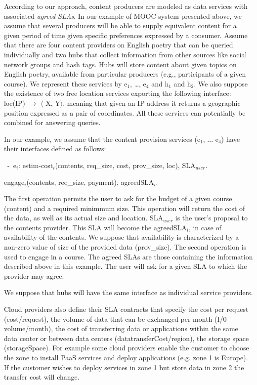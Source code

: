 According to our approach, content producers are modeled as data services with associated \textit{agreed SLAs}. 
In our example of MOOC system presented above, we assume that several producers will be able to supply equivalent content for a given period of time  given specific  preferences expressed by a consumer. 
Assume that there are four content providers on English poetry that can be queried individually and two hubs that collect information from other sources like social network groups and hash tags.
Hubs will store content about given topics on  English poetry, available from particular producers (e.g., participants of a given course).
We represent these services by {\sf e$_1$, \dots, e$_4$} and {\sf h$_1$} and {\sf h$_2$}.
We also suppose the existence of two free location services exporting the following interface: {\sf loc(IP) $\rightarrow$ $\langle$ X, Y$\rangle$}, meaning that given an IP address it returns a geographic position expressed as a pair of coordinates. 
All these services can potentially be combined for answering queries.

In our example, we assume that the content provision services ({\sf e$_1$, ... e$_4$}) have their interfaces defined as follows:
\begin{trivlist}\sf\footnotesize
\item[~-~e$_i$:]estim-cost$_i$(contents, req\_size, cost, prov\_size, loc), SLA$_\mathit{user}$.

                engage$_i$(contents, req\_size, payment), agreedSLA$_i$.
\end{trivlist}

The first operation permits the user to ask for the budget of a given course (content) and a required minimmum size.
This operation will return the cost of the data, as well as its actual size and location.
{\sf SLA}$_\mathit{user}$ is the user's proposal to the contents provider. 
This SLA will become the {\sf agreedSLA}$_i$, in case of availability of the contents. 
We suppose that availability is characterized by a non-zero value of size of the provided data ({\sf prov\_size}).
The second operation is used to engage in a course. 
The agreed SLAs are those containing the information described above in this example.
The user will ask for a given SLA to which the provider may agree.

We suppose that hubs will have the same interface as individual service providers.

Cloud providers also define their SLA contracts that specify the cost per request ({\sf cost/request}), the volume of data that can be exchanged per month ({\sf I/0 volume/month}), the cost of transferring data or applications within the same data center or between data centers ({\sf datatransferCost/region}), the storage space ({\sf storageSpace}). For example some cloud providers enable the customer to choose the zone to install PaaS services and deploy applications (e.g. zone 1 is Europe). If the customer wishes to deploy services in zone 1 but store data in zone 2 the transfer cost will change.

